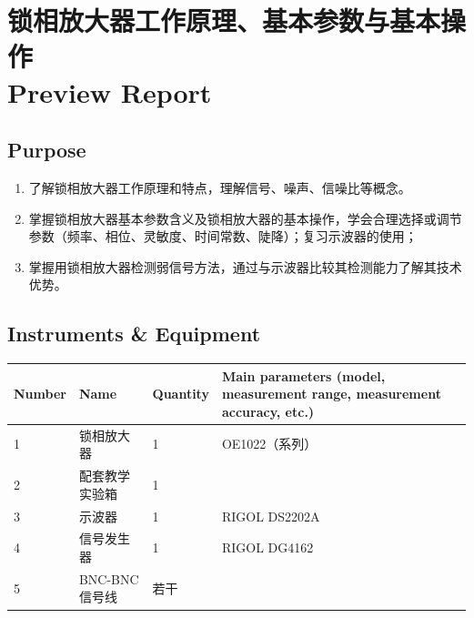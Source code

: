 
\setcounter{section}{0}
\section{锁相放大器工作原理、基本参数与基本操作 \\ Preview Report}


\subsection{Purpose}
\begin{enumerate}
	\item 了解锁相放大器工作原理和特点，理解信号、噪声、信噪比等概念。
	\item 掌握锁相放大器基本参数含义及锁相放大器的基本操作，学会合理选择或调节参数（频率、相位、灵敏度、时间常数、陡降）；复习示波器的使用；
	\item 掌握用锁相放大器检测弱信号方法，通过与示波器比较其检测能力了解其技术优势。
\end{enumerate}


\subsection{Instruments \& Equipment}
\begin{table}[htbp]
	\centering
	\renewcommand\arraystretch{1.6}
	\begin{tabular}{|p{}|p{}|p{}|p{}|}
		\hline
		Number & Name & Quantity & Main parameters (model, measurement range, measurement accuracy, etc.) \\
		\hline
		1 & 锁相放大器 & 1 & OE1022（系列） \\
		\hline
		2 & 配套教学实验箱 & 1 & \\
		\hline
		3 & 示波器 & 1 & RIGOL DS2202A \\
		\hline
		4 & 信号发生器 & 1 & RIGOL DG4162 \\
		\hline
		5 & BNC-BNC信号线 & 若干 & \\
		\hline
	\end{tabular}
\end{table}


